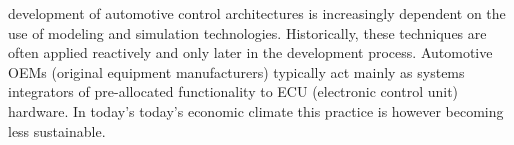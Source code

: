 
% 
% 
% 
% 

 development of automotive control architectures is increasingly dependent on the use of modeling and simulation technologies. Historically, these techniques are often applied reactively and only later in the development process. Automotive OEMs (original equipment manufacturers) typically act mainly as
 systems  integrators of pre-allocated
 functionality to  ECU (electronic control unit) hardware. In today's today's economic climate this practice is however becoming less sustainable. 
 
